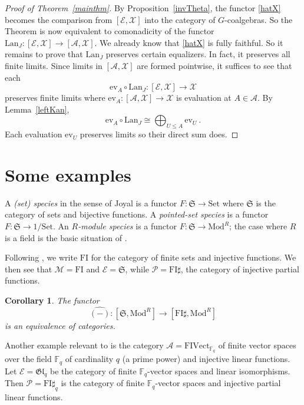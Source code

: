 \documentclass[a4paper,12pt,reqno]{amsart}
\newtheorem{corollary}[theorem]{Corollary}
\theoremstyle{definition}
\theoremstyle{fact}
\theoremstyle{genquest}
\theoremstyle{step}
\newcommand{\lra}{\longrightarrow}
\def\CA{{\mathscr A}}
\def\CE{{\mathscr E}}
\def\CM{{\mathscr M}}
\def\CP{{\mathscr P}}
\def\CX{{\mathscr X}}
\begin{document}
\begin{proof}[Proof of Theorem~\ref{mainthm}]
By Proposition~\ref{invTheta}, the functor \eqref{hatX} becomes the
comparison from $[\CE,\CX]$ into the category of $G$-coalgebras. 
So the Theorem is now equivalent to comonadicity of the functor 
$\mathrm{Lan}_J : [\CE,\CX]\lra [\CA,\CX]$.
We already know that \eqref{hatX} is fully faithful.
So it remains to prove that $\mathrm{Lan}_J$ preserves certain equalizers.
In fact, it preserves all finite limits. Since limits in $[\CA,\CX]$ are formed
pointwise, it suffices to see that each 
$$\mathrm{ev}_A\circ \mathrm{Lan}_J : [\CE,\CX]\lra \CX$$
preserves finite limits where $\mathrm{ev}_A : [\CA,\CX]\lra \CX$ is evaluation
at $A\in \CA$. By Lemma~\ref{leftKan}, 
$$\mathrm{ev}_A\circ \mathrm{Lan}_J \cong \bigoplus_{U\le A}\mathrm{ev}_U \ .$$
Each evaluation $\mathrm{ev}_U$ preserves limits so their direct sum does.    
\end{proof}

\section{Some examples}\label{exx}

A {\em (set) species} in the sense of Joyal \cite{Species} is a functor 
$F : \mathfrak{S} \lra \mathrm{Set}$
where $\mathfrak{S}$ is the category of sets and bijective functions. 
A {\em pointed-set species} is a functor 
$F : \mathfrak{S} \lra 1/\mathrm{Set}$.
An {\em $R$-module species} is a functor 
$F : \mathfrak{S} \lra \mathrm{Mod}^R$; the case where $R$ is
a field is the basic situation of \cite{AnalFunct}.

Following \cite{CEF2012}, we write $\mathrm{FI}$ for the category of finite sets
and injective functions. We then see that 
$\CM = \mathrm{FI}$ and $\CE = \mathfrak{S}$,
while $\CP = \mathrm{FI}\sharp$, the category of injective partial functions.  

\begin{corollary} \cite{CEF2012} The functor
$$\widehat{(-)} : [\mathfrak{S}, \mathrm{Mod}^R] \lra [\mathrm{FI}\sharp, \mathrm{Mod}^R]$$
is an equivalence of categories.
\end{corollary}

Another example relevant to \cite{repfgl} is the category $\CA = \mathrm{FIVect}_{\mathbb{F}_q}$
of finite vector spaces over the field $\mathbb{F}_q$ of cardinality 
$q$ (a prime power) and injective linear functions.
Let $\CE = \mathfrak{Gl}_q$ be the category of finite
$\mathbb{F}_q$-vector spaces and linear isomorphisms. 
Then $\CP = \mathrm{FI}\sharp_q$ is the
category of finite $\mathbb{F}_q$-vector spaces and injective 
partial linear functions.
\end{document}
